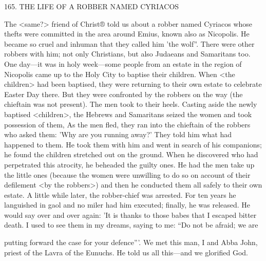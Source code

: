 165.
THE LIFE OF A ROBBER NAMED CYRIACOS

The <same?> friend of Christ® told us about a robber named
Cyriacos whose thefts were committed in the area around Emius,
known also as Nicopolis.
He became so cruel and inhuman that
they called him 'the wolf”.
There were other robbers with him; not
only Christians, but also Judaeans and Samaritans too.
One day—it
was in holy week—some people from an estate in the region of
Nicopolis came up to the Holy City to baptise their children.
When
<the children> had been baptised, they were returning to their own
estate to celebrate Easter Day there.
But they were confronted by
the robbers on the way (the chieftain was not present).
The men
took to their heels.
Casting aside the newly baptised <children>, the
Hebrews and Samaritans seized the women and took possession of
them, As the men fled, they ran into the chieftain of the robbers
who asked them: 'Why are you running away?' They told him what
had happened to them.
He took them with him and went in search
of his companions; he found the children stretched out on the
ground.
When he discovered who had perpetrated this atrocity, he
beheaded the guilty ones.
He had the men take up the little ones
(because the women were unwilling to do so on account of their
defilement <by the robbers>) and then he conducted them all safely
to their own estate.
A little while later, the robber-chief was
arrested.
For ten years he languished in gaol and no miler had him
executed; finally, he was released.
He would say over and over
again: 'It is thanks to those babes that I escaped bitter death.
I used
to see them in my dreams, saying to me: “Do not be afraid; we are

putting forward the case for your defence”'.
We met this man, I and
Abba John, priest of the Lavra of the Eunuchs.
He told us all
this—and we glorified God.

